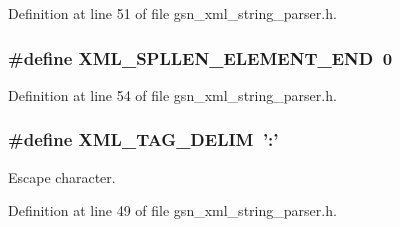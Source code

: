 Definition at line 51 of file gsn\_\-xml\_\-string\_\-parser.h.

\hypertarget{a00617_ad6b2d5ba3c774ca9a68e2c1a80c1a6f1}{
\subsubsection[{XML\_\-SPLLEN\_\-ELEMENT\_\-END}]{\setlength{\rightskip}{0pt plus 5cm}\#define XML\_\-SPLLEN\_\-ELEMENT\_\-END~0}}
\label{a00617_ad6b2d5ba3c774ca9a68e2c1a80c1a6f1}


Definition at line 54 of file gsn\_\-xml\_\-string\_\-parser.h.

\hypertarget{a00617_a09493df9ef1c8c1efcd140f312c1339a}{
\subsubsection[{XML\_\-TAG\_\-DELIM}]{\setlength{\rightskip}{0pt plus 5cm}\#define XML\_\-TAG\_\-DELIM~':'}}
\label{a00617_a09493df9ef1c8c1efcd140f312c1339a}
Escape character. 

Definition at line 49 of file gsn\_\-xml\_\-string\_\-parser.h.



